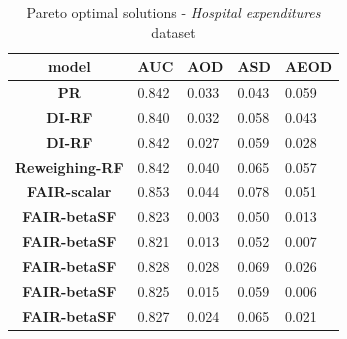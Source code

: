 \documentclass[preprint,12pt]{elsarticle}
\begin{document}
\begin{table}
	\centering
	\caption{Pareto optimal solutions - \textit{Hospital expenditures} dataset}
	\begin{tabular}{|c|l|l|l|l|}
		\hline
		\textbf{model}          & \multicolumn{1}{c|}{\textbf{AUC}} & \multicolumn{1}{c|}{\textbf{AOD}} & \multicolumn{1}{c|}{\textbf{ASD}} & \multicolumn{1}{c|}{\textbf{AEOD}} \\ \hline
		\textbf{PR}             & 0.842                             & 0.033                             & 0.043                             & 0.059                              \\ \hline
		\textbf{DI-RF}          & 0.840                             & 0.032                             & 0.058                             & 0.043                              \\ \hline
		\textbf{DI-RF}          & 0.842                             & 0.027                             & 0.059                             & 0.028                              \\ \hline
		\textbf{Reweighing-RF}  & 0.842                             & 0.040                             & 0.065                             & 0.057                              \\ \hline
		\textbf{FAIR-scalar}    & 0.853                             & 0.044                             & 0.078                             & 0.051                              \\ \hline
		\textbf{FAIR-betaSF}    & 0.823                             & 0.003                             & 0.050                             & 0.013                              \\ \hline
		\textbf{FAIR-betaSF}    & 0.821                             & 0.013                             & 0.052                             & 0.007                              \\ \hline
		\textbf{FAIR-betaSF}    & 0.828                             & 0.028                             & 0.069                             & 0.026                              \\ \hline
		\textbf{FAIR-betaSF}    & 0.825                             & 0.015                             & 0.059                             & 0.006                              \\ \hline
		\textbf{FAIR-betaSF}    & 0.827                             & 0.024                             & 0.065                             & 0.021                              \\ \hline

\end{tabular}
\end{table}
\end{document}
